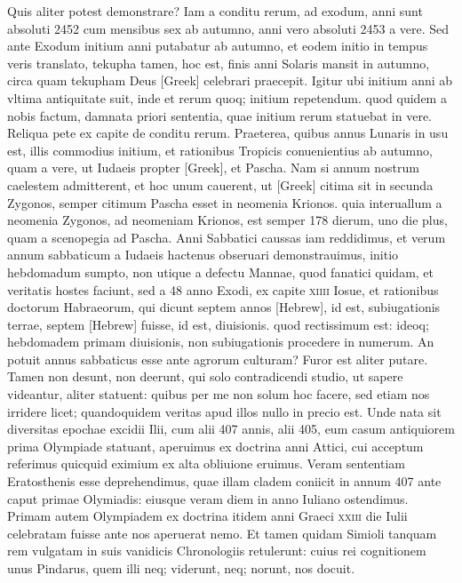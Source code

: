 \begin{parnumbers}
{}
Quis aliter potest demonstrare?
\lnr{}Iam a conditu rerum, ad exodum,
anni sunt absoluti 2452 cum mensibus sex ab autumno, anni vero
absoluti 2453 a vere.
\lnr{}Sed ante Exodum initium anni putabatur ab
autumno, et eodem initio in tempus veris translato, tekupha tamen,
hoc est, finis anni Solaris mansit in autumno, circa quam tekupham
Deus \textgreek{[Greek]} celebrari praecepit.
\lnr{}Igitur ubi initium anni
ab vltima antiquitate suit, inde et rerum quoq; initium repetendum.
\lnr{}quod quidem a nobis factum, damnata priori sententia, quae
initium rerum statuebat in vere.
\lnr{}Reliqua pete ex capite de conditu
rerum.
\lnr{}Praeterea, quibus annus Lunaris in usu est, illis commodius
initium, et rationibus Tropicis conuenientius ab autumno, quam
a vere, ut Iudaeis propter \textgreek{[Greek]}, et Pascha.
\lnr{}Nam si annum
nostrum caelestem admitterent, et hoc unum cauerent, ut \textgreek{[Greek]}
citima sit in secunda Zygonos, semper citimum Pascha esset in neomenia
Krionos.
\lnr{}quia interuallum a neomenia Zygonos, ad neomeniam
Krionos, est semper 178 dierum, uno die plus, quam a scenopegia
ad Pascha.
\lnr{}Anni Sabbatici caussas iam reddidimus, et verum
annum sabbaticum a Iudaeis hactenus obseruari demonstrauimus,
initio hebdomadum sumpto, non utique a defectu Mannae,
quod fanatici quidam, et veritatis hostes faciunt, sed a 48 anno Exodi,
ex capite \textsc{xiiii} Iosue, et rationibus doctorum Habraeorum, qui
dicunt septem annos \texthebrew{[Hebrew]}, id est, subiugationis terrae,
septem \texthebrew{[Hebrew]}
fuisse, id est, diuisionis.
\lnr{}quod rectissimum est: ideoq; hebdomadem
primam diuisionis, non subiugationis procedere in numerum.
\lnr{}An
potuit annus sabbaticus esse ante agrorum culturam?
\lnr{}Furor est aliter putare.
\lnr{}Tamen non desunt, non deerunt, qui solo contradicendi
studio, ut sapere videantur, aliter statuent: quibus per me non solum
hoc facere, sed etiam nos irridere licet; quandoquidem veritas apud
illos nullo in precio est.
\lnr{}Unde nata sit diversitas epochae excidii Ilii,
cum alii 407 annis, alii 405, eum casum antiquiorem prima Olympiade
statuant, aperuimus ex doctrina anni Attici, cui acceptum
referimus quicquid eximium ex alta obliuione eruimus.
\lnr{}Veram sententiam
Eratosthenis esse deprehendimus, quae illam cladem coniicit
in annum 407 ante caput primae Olymiadis: eiusque veram
diem in anno Iuliano ostendimus.
\lnr{}Primam autem Olympiadem
ex doctrina itidem anni Graeci \textsc{xxiii} die Iulii celebratam fuisse ante
nos aperuerat nemo.
\lnr{}Et tamen quidam Simioli tanquam rem
vulgatam in suis vanidicis Chronologiis retulerunt: cuius rei cognitionem
unus Pindarus, quem illi neq; viderunt, neq; norunt, nos
docuit.



\end{parnumbers}
